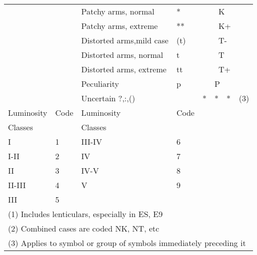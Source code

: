 \begin{center}
\begin{tabular}{l|l|l|l|lc}
          &             & Patchy arms, normal     & *     &~~~~K     &       \\
          &             & Patchy arms, extreme    & **    &~~~~K+    &       \\
          &             & Distorted arms,mild case& (t)   &~~~~T-    &       \\
          &             & Distorted arms, normal  & t     &~~~~T     &       \\
          &             & Distorted arms, extreme & tt    &~~~~T+    &       \\
          &             & Peculiarity             & p     &~~~P      &       \\
          &             & Uncertain ?,:,()        &       &*~~*~~*   & (3)   \\
\hline
Luminosity& Code & Luminosity& Code \\
Classes   &      & Classes   &      \\
\hline
 I        &  1   & III-IV    &  6  \\
 I-II     &  2   & IV        &  7  \\
 II       &  3   & IV-V      &  8  \\
 II-III   &  4   & V         &  9  \\
 III      &  5   &           & \\
\hline
\multicolumn{6}{l}{(1) Includes lenticulars, especially in ES, E9} \\
\multicolumn{6}{l}{(2) Combined cases are coded NK, NT, etc} \\
\multicolumn{6}{l}{(3) Applies to symbol or group of symbols immediately
preceding it} \\
\end{tabular}
\end{center}
\label{t:ddo}

